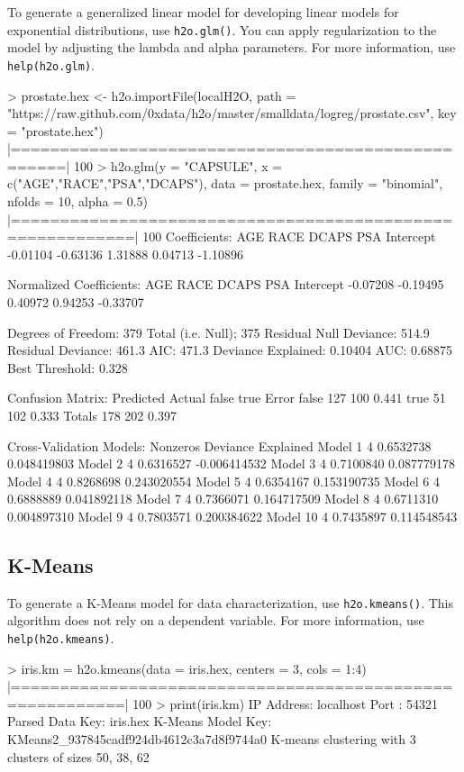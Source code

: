 \documentclass[11pt]{article}
\begin{document}
{To generate a generalized linear model for developing linear models for exponential distributions, use {\texttt{h2o.glm()}}. You can apply regularization to the model by adjusting the lambda and alpha parameters. 
For more information, use {\texttt{help(h2o.glm)}}.
\begin{spverbatim}
> prostate.hex <- h2o.importFile(localH2O, path =
"https://raw.github.com/0xdata/h2o/master/smalldata/logreg/prostate.csv",
key = "prostate.hex")
 |===================================================| 100%
> h2o.glm(y = "CAPSULE", x = c("AGE","RACE","PSA","DCAPS"), data =
prostate.hex, family = "binomial", nfolds = 10, alpha = 0.5)
 |==========================================================| 100%
    Coefficients:
    AGE          RACE     DCAPS       PSA   Intercept
    -0.01104  -0.63136   1.31888   0.04713  -1.10896

    Normalized Coefficients:
    AGE          RACE     DCAPS       PSA   Intercept
    -0.07208  -0.19495   0.40972   0.94253  -0.33707

    Degrees of Freedom: 379 Total (i.e. Null);  375 Residual
    Null Deviance:     514.9
    Residual Deviance: 461.3  AIC: 471.3
    Deviance Explained: 0.10404
    AUC: 0.68875  Best Threshold: 0.328
    
    Confusion Matrix:
            Predicted
    Actual   false true Error
      false    127  100 0.441
      true      51  102 0.333
      Totals   178  202 0.397

    Cross-Validation Models:
                Nonzeros               Deviance Explained
      Model 1      4       0.6532738      0.048419803
      Model 2      4       0.6316527     -0.006414532
      Model 3      4       0.7100840      0.087779178
      Model 4      4       0.8268698      0.243020554
      Model 5      4       0.6354167      0.153190735
      Model 6      4       0.6888889      0.041892118
      Model 7      4       0.7366071      0.164717509
      Model 8      4       0.6711310      0.004897310
      Model 9      4       0.7803571      0.200384622
      Model 10     4       0.7435897      0.114548543
\end{spverbatim}

\subsection{K-Means}

To generate a K-Means model for data characterization, use {\texttt{h2o.kmeans()}}. This algorithm does not rely on a dependent variable. For more information, use {\texttt{help(h2o.kmeans)}}.
\begin{spverbatim}
> iris.km = h2o.kmeans(data = iris.hex, centers = 3, cols = 1:4)
  |=========================================================| 100%
> print(iris.km)
IP Address: localhost 
Port      : 54321 
Parsed Data Key: iris.hex 
K-Means Model Key: KMeans2_937845cadf924db4612c3a7d8f9744a0
K-means clustering with 3 clusters of sizes 50, 38, 62


\end{spverbatim}}
\end{document}
